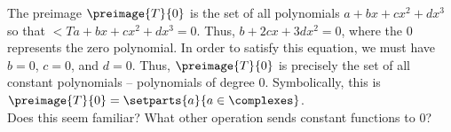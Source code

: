 The preimage $\preimage{T}{0}$ is the set of all polynomials $a + bx + cx^2 + dx^3$ so that 
$\lt{T}{a + bx + cx^2 + dx^3} = 0$.  Thus, $b + 2cx + 3dx^2 = 0$, where the $0$ represents the zero polynomial.  In order to satisfy this equation, we must have $b = 0$, $c = 0$, and $d = 0$.  Thus, $\preimage{T}{0}$ is precisely the set of all constant polynomials -- polynomials of degree 0. Symbolically, this is $\preimage{T}{0} = \setparts{a}{a\in\complexes}$.\\
%
Does this seem familiar?  What other operation sends constant functions to 0?